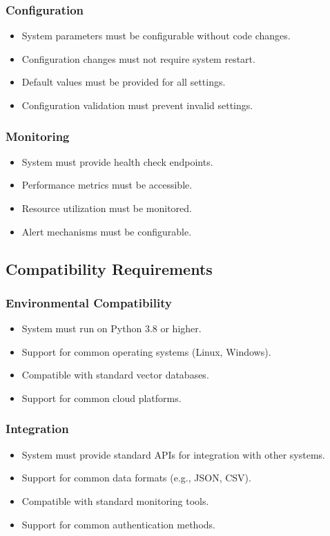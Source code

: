 \documentclass[12pt,a4paper]{report}
\begin{document}
\subsubsection{Configuration}
\begin{itemize}
    \item System parameters must be configurable without code changes.
    \item Configuration changes must not require system restart.
    \item Default values must be provided for all settings.
    \item Configuration validation must prevent invalid settings.
\end{itemize}

\subsubsection{Monitoring}
\begin{itemize}
    \item System must provide health check endpoints.
    \item Performance metrics must be accessible.
    \item Resource utilization must be monitored.
    \item Alert mechanisms must be configurable.
\end{itemize}

\subsection{Compatibility Requirements}

\subsubsection{Environmental Compatibility}
\begin{itemize}
    \item System must run on Python 3.8 or higher.
    \item Support for common operating systems (Linux, Windows).
    \item Compatible with standard vector databases.
    \item Support for common cloud platforms.
\end{itemize}

\subsubsection{Integration}
\begin{itemize}
    \item System must provide standard APIs for integration with other systems.
    \item Support for common data formats (e.g., JSON, CSV).
    \item Compatible with standard monitoring tools.
    \item Support for common authentication methods.
\end{itemize}
\end{document}
